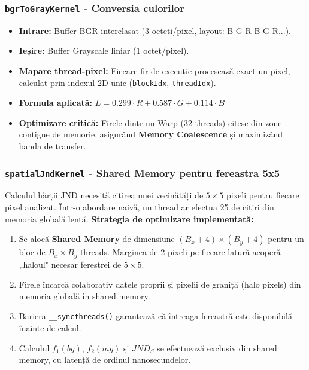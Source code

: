 \documentclass[12pt,a4paper]{article}
\begin{document}
\subsubsection{\texttt{bgrToGrayKernel} - Conversia culorilor}
\begin{itemize}[noitemsep]
    \item \textbf{Intrare:} Buffer BGR interclasat (3 octeți/pixel, layout: B-G-R-B-G-R...).
    \item \textbf{Ieșire:} Buffer Grayscale liniar (1 octet/pixel).
    \item \textbf{Mapare thread-pixel:} Fiecare fir de execuție procesează exact un pixel, calculat prin indexul 2D unic (\texttt{blockIdx}, \texttt{threadIdx}).
    \item \textbf{Formula aplicată:} $L = 0.299 \cdot R + 0.587 \cdot G + 0.114 \cdot B$
    \item \textbf{Optimizare critică:} Firele dintr-un Warp (32 threads) citesc din zone contigue de memorie, asigurând \textbf{Memory Coalescence} și maximizând banda de transfer.
\end{itemize}
\subsubsection{\texttt{spatialJndKernel} - Shared Memory pentru fereastra 5x5}
Calculul hărții JND necesită citirea unei vecinătăți de $5 \times 5$ pixeli pentru fiecare pixel analizat. Într-o abordare naivă, un thread ar efectua 25 de citiri din memoria globală lentă.
\textbf{Strategia de optimizare implementată:}
\begin{enumerate}[noitemsep]
    \item Se alocă \textbf{Shared Memory} de dimensiune $(B_x + 4) \times (B_y + 4)$ pentru un bloc de $B_x \times B_y$ threads. Marginea de 2 pixeli pe fiecare latură acoperă „haloul" necesar ferestrei de $5 \times 5$.
    \item Firele încarcă colaborativ datele proprii și pixelii de graniță (halo pixels) din memoria globală în shared memory.
    \item Bariera \texttt{\_\_syncthreads()} garantează că întreaga fereastră este disponibilă înainte de calcul.
    \item Calculul $f_1(bg)$, $f_2(mg)$ și $JND_S$ se efectuează exclusiv din shared memory, cu latență de ordinul nanosecundelor.
\end{enumerate}
\end{document}
